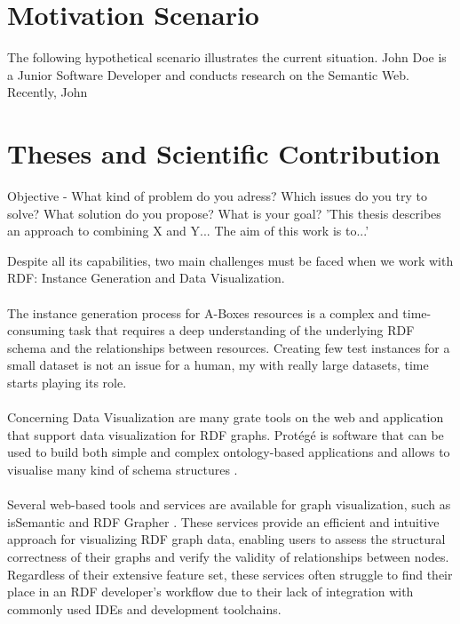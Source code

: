 \section{Motivation Scenario\label{sec:moti}}

The following hypothetical scenario illustrates the current situation.
John Doe is a Junior Software Developer and conducts research on the Semantic Web.
Recently, John 

\section{Theses and Scientific Contribution  \label{sec:objective}}

Objective - What kind of problem do you adress? Which issues do you try to solve? What solution do you propose? What is your goal?
'This thesis describes an approach to combining X and Y... The aim of this work is to...'

Despite all its capabilities, two main challenges must be faced when we work with RDF: Instance Generation and Data Visualization.
\\
\\
The instance generation process for A-Boxes resources is a complex and time-consuming task that requires a deep understanding of the underlying RDF schema and the relationships between resources. 
Creating few test instances for a small dataset is not an issue for a human, my with really large datasets, time starts playing its role.
\\
\\
Concerning Data Visualization are many grate tools on the web and application that support data visualization for RDF graphs.
Protégé is software that can be used to build both simple and complex ontology-based applications and allows to visualise many kind of schema structures \cite{protege}.
\\
\\
Several web-based tools and services are available for graph visualization, such as isSemantic \cite{} and RDF Grapher \cite{}.
These services provide an efficient and intuitive approach for visualizing RDF graph data, enabling users to assess the structural correctness of their graphs and verify the validity of relationships between nodes.
\\
Regardless of their extensive feature set, these services often struggle to find their place in an RDF developer’s workflow due to their lack of integration with commonly used IDEs and development toolchains.


